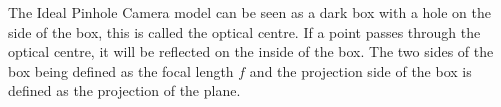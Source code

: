 \label{chap:imgpros}

\label{sec:imgintro}

\label{sec:imgpinhole}

The Ideal Pinhole Camera model can be seen as a dark box with a hole on the side of the box, this is called the optical centre.
If a point passes through the optical centre, it will be reflected on the inside of the box. The two sides of the box being defined
as the focal length $f$ and the projection side of the box is defined as the projection of the plane.




\label{sec:imgmesurement}

